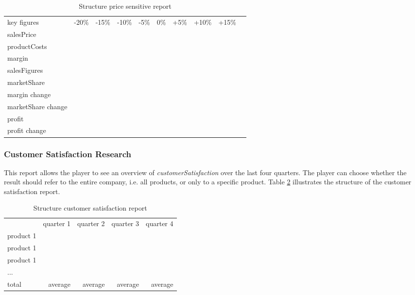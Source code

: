 \begin{table}[ht]
\centering
\begin{tabular}{|l|r|r|r|r|r|r|r|r|r|}
\hline
key figures             & -20\% & -15\% & -10\% & -5\%  & 0\%   & +5\%  & +10\% & +15\%   \\
salesPrice            &       &       &       &       &       &       &       &         \\
productCosts           &       &       &       &       &       &       &       &         \\
margin                  &       &       &       &       &       &       &       &         \\
salesFigures            &       &       &       &       &       &       &       &         \\
marketShare            &       &       &       &       &       &       &       &         \\
margin change           &       &       &       &       &       &       &       &         \\
marketShare change     &       &       &       &       &       &       &       &         \\
profit             &       &       &       &       &       &       &       &         \\
profit change             &       &       &       &       &       &       &       &         \\
\hline
\end{tabular}
\caption{Structure price sensitive report}
\label{MR_price_sensitive}
\end{table}

\subsubsection{Customer Satisfaction Research}
This report allows the player to see an overview of \textit{customerSatisfaction} over the last four quarters. The player can choose whether the result should refer to the entire company, i.e. all products, or only to a specific product. Table \ref{MR_customer_satisfaction} illustrates the structure of the customer satisfaction report. \\

\begin{table}[ht]
\centering
\begin{tabular}{|l|r|r|r|r|}
\hline
            & quarter 1   & quarter 2  & quarter 3 & quarter 4 \\
product 1   &             &            &           &           \\
product 1   &             &            &           &           \\
product 1   &             &            &           &           \\
...         &             &            &           &           \\
total       & average     & average    & average   & average   \\
\hline
\end{tabular}
\caption{Structure customer satisfaction report}
\label{MR_customer_satisfaction}
\end{table}

